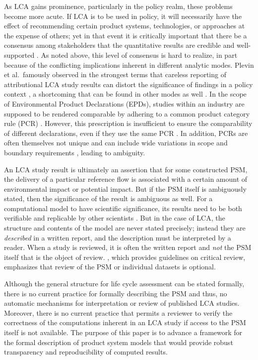 As LCA gains prominence, particularly in the policy realm, these problems become more acute.  If LCA is to be used in policy, it will necessarily have the effect of recommending certain product systems, technologies, or approaches at the expense of others; yet in that event it is critically important that there be a consensus among stakeholders that the quantitative results are credible and well-supported \citep{Rainville_2015, McManus_2015}.  As noted above, this level of consensus is hard to realize, in part because of the conflicting implications inherent in different analytic modes.
Plevin et al.\ famously observed in the strongest terms that careless reporting of attributional LCA study results can distort the significance of findings in a policy context \citep{Plevin_2013}, a shortcoming that can be found in other modes as well \citep{Brandao_2014}.  In the scope of Environmental Product Declarations (EPDs), studies within an industry are supposed to be rendered comparable by adhering to a common product category rule (PCR) \citep{Fet_2006}.  However, this prescription is insufficient to ensure the comparability of different declarations, even if they use the same PCR \citep{Modahl_2012}.  In addition, PCRs are often themselves not unique and can include wide variations in scope and boundary requirements \citep{Subramanian_2012}, leading to ambiguity.  

An LCA study result is ultimately an assertion that for some constructed PSM, the delivery of a particular reference flow is associated with a certain amount of environmental impact or potential impact.  But if the PSM itself is ambiguously stated, then the significance of the result is ambiguous as well.  For a computational model to have scientific significance, its results need to be both verifiable and replicable by other scientists \citep{Fomel_2009, Mesirov_2010}.  But in the case of LCA, the structure and contents of the model are never stated precisely; instead they are \emph{described} in a written report, and the description must be interpreted by a reader.  When a study is reviewed, it is often the written report and \emph{not} the PSM itself that is the object of review.  \cite{iso14071}, which provides guidelines on critical review, emphasizes that review of the PSM or individual datasets is optional.  

Although the general structure for life cycle assessment can be stated formally, there is no current practice for formally describing the PSM and thus, no automatic mechanisms for interpretation or review of published LCA studies.  Moreover, there is no current practice that permits a reviewer to verify the correctness of the computations inherent in an LCA study if access to the PSM itself is not available.  The purpose of this paper is to advance a framework for the formal description of product system models that would provide robust transparency and reproducibility of computed results. 

